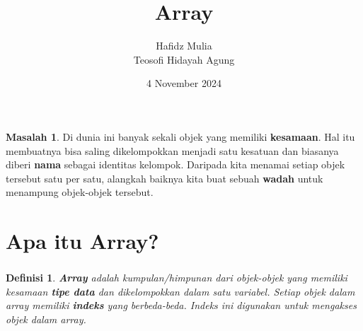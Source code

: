 \documentclass[aspectratio=169]{beamer}
\author[Tew \& Haf]{Hafidz Mulia\\Teosofi Hidayah Agung}
\date{4 November 2024}
\title[Alpro 1 - Week 8]{Array}
\institute[Matematika ITS]{Departemen Matematika\\ Institut Teknologi Sepuluh Nopember}
\newtheorem*{definisi}{Definisi}
\theoremstyle{definition}
\newtheorem*{masalah}{Masalah}
\begin{document}
    {
    \begin{frame}
        \titlepage
    \end{frame}
    }

    
    \begin{frame}
        \begin{masalah}
            Di dunia ini banyak sekali objek yang memiliki \textbf{kesamaan}. Hal itu membuatnya bisa saling dikelompokkan menjadi satu kesatuan dan biasanya diberi \textbf{nama} sebagai identitas kelompok. Daripada kita menamai setiap objek tersebut satu per satu, alangkah baiknya kita buat sebuah \textbf{wadah} untuk menampung objek-objek tersebut. 
        \end{masalah}
    \end{frame}

    \section{Apa itu Array?}
    \begin{frame}
        \frametitle{\insertsection}
        \begin{definisi}
            \textbf{Array} adalah kumpulan/himpunan dari objek-objek yang memiliki kesamaan \textbf{tipe data} dan dikelompokkan dalam satu variabel. Setiap objek dalam array memiliki \textbf{indeks} yang berbeda-beda. Indeks ini digunakan untuk mengakses objek dalam array.
        \end{definisi}
    \end{frame}
\end{document}
